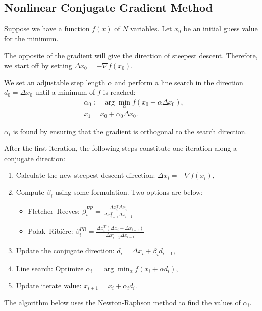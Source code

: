 \documentclass[11pt]{article}
\begin{document}
\subsection{Nonlinear Conjugate Gradient Method}
Suppose we have a function $f(x)$ of $N$ variables. Let $x_0$ be an initial guess value for the minimum.

The opposite of the gradient will give the direction of steepest descent. Therefore, we start off by setting $\Delta x_0=-\nabla f(x_0)$.

We set an adjustable step length $\alpha$ and perform a line search in the direction $d_0=\Delta x_0$ until a minimum of $f$ is reached:
\begin{align*}
	&\alpha_0:=\arg\min_{\alpha} f(x_0+\alpha\Delta x_0),\\
	&x_1=x_0+\alpha_0\Delta x_0.
\end{align*}

$\alpha_i$ is found by ensuring that the gradient is orthogonal to the search direction.

After the first iteration, the following steps constitute one iteration along a conjugate direction:
\begin{enumerate}
	\item Calculate the new steepest descent direction: $\Delta x_i=-\nabla f(x_i)$,
	\item Compute $\beta_i$ using some formulation. Two options are below:
	\begin{itemize}
		\item Fletcher--Reeves: $\beta_i^{FR}=\frac{\Delta x_i^T\Delta x_i}{\Delta x_{i=1}^T\Delta x_{i-1}}$
		\item Polak--Ribi\`{e}re: $\beta_{i}^{PR}=\frac{\Delta x_i^T(\Delta x_i-\Delta x_{i-1})}{\Delta x_{i-1}^T\Delta x_{i-1}}$
	\end{itemize}
	\item Update the conjugate direction: $d_i=\Delta x_i+\beta_i d_{i-1}$,
	\item Line search: Optimize $\alpha_i =\arg\min_{\alpha} f(x_i+\alpha d_i)$,
	\item Update iterate value: $x_{i+1}=x_i+\alpha_i d_i$.
\end{enumerate}

The algorithm below uses the Newton-Raphson method to find the values of $\alpha_i$.
\end{document}
